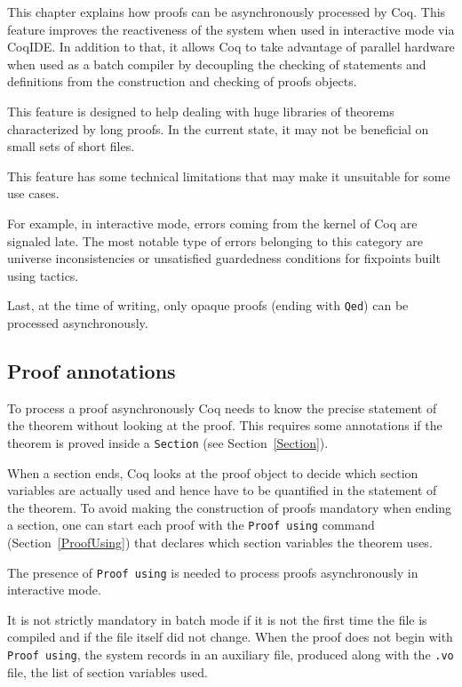 
\label{pralitp}

This chapter explains how proofs can be asynchronously processed by Coq.
This feature improves the reactiveness of the system when used in interactive
mode via CoqIDE.  In addition to that, it allows Coq to take advantage of
parallel hardware when used as a batch compiler by decoupling the checking
of statements and definitions from the construction and checking of proofs
objects.

This feature is designed to help dealing with huge libraries of theorems
characterized by long proofs. In the current state, it may not be beneficial
on small sets of short files.

This feature has some technical limitations that may make it unsuitable for
some use cases.

For example, in interactive mode, errors coming from the kernel of Coq are
signaled late.  The most notable type of errors belonging to this category are
universe inconsistencies or unsatisfied guardedness conditions for fixpoints
built using tactics.

Last, at the time of writing, only opaque proofs (ending with \texttt{Qed}) can be
processed asynchronously.

\subsection{Proof annotations}

To process a proof asynchronously Coq needs to know the precise statement
of the theorem without looking at the proof.  This requires some annotations
if the theorem is proved inside a \texttt{Section} (see Section~\ref{Section}).

When a section ends, Coq looks at the proof object to decide which
section variables are actually used and hence have to be quantified in the
statement of the theorem.  To avoid making the construction of proofs
mandatory when ending a section, one can start each proof with the
\texttt{Proof using} command (Section~\ref{ProofUsing}) that declares which
section variables the theorem uses.

The presence of \texttt{Proof using} is needed to process proofs
asynchronously in interactive mode.

It is not strictly mandatory in batch mode if it is not the first time
the file is compiled and if the file itself did not change. When the
proof does not begin with \texttt{Proof using}, the system records in an
auxiliary file, produced along with the \texttt{.vo} file, the list of
section variables used.

